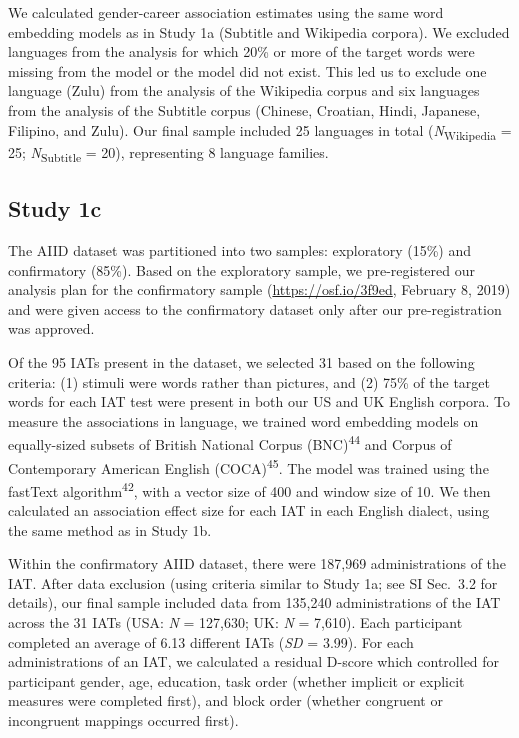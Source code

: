 \documentclass[9pt,twocolumn]{pnas-new}
\begin{document}
We calculated gender-career association estimates using the same word embedding models
as in Study 1a (Subtitle and Wikipedia corpora). We excluded languages
from the analysis for which 20\% or more of the target words were
missing from the model or the model did not exist. This led us to
exclude one language (Zulu) from the analysis of the Wikipedia corpus
and six languages from the analysis of the Subtitle corpus (Chinese,
Croatian, Hindi, Japanese, Filipino, and Zulu). Our final sample
included 25 languages in total (\emph{N}\textsubscript{Wikipedia} = 25;
\emph{N}\textsubscript{Subtitle} = 20), representing 8 language
families. 


\subsection*{Study 1c}

The AIID dataset was partitioned into two samples: exploratory (15\%) and
confirmatory (85\%). Based on the exploratory sample, we pre-registered
our analysis plan for the confirmatory sample
(\url{https://osf.io/3f9ed}, February 8, 2019) and were given access to the confirmatory dataset only after our pre-registration was approved. 

Of the 95 IATs present in the dataset, we selected 31 based on the following criteria: (1) stimuli were words rather than pictures, and (2) 75\% of the target words for each IAT test were present in both our US and UK English corpora. To measure the associations in language, we trained word embedding models on equally-sized subsets of British National Corpus (BNC)\textsuperscript{44} and Corpus of Contemporary American English (COCA)\textsuperscript{45}. The model was trained using the fastText algorithm\textsuperscript{42}, with a vector size of 400 and  window size of 10. We then calculated an association effect size for each IAT in each English dialect, using the same method as in Study 1b. 


Within the confirmatory AIID dataset, there were 187,969 administrations
of the IAT. After data exclusion (using criteria similar to Study 1a; see SI Sec.\ 3.2 for details), our final sample
included data from 135,240 administrations of the IAT across the 31 IATs (USA: \emph{N} = 127,630; UK: \emph{N} = 7,610). Each participant
completed an average of 6.13 different IATs (\emph{SD} = 3.99). For each administrations of an IAT, we calculated a residual D-score which controlled for participant gender, age, education, task order (whether implicit or explicit measures were completed first), and block order (whether congruent or incongruent mappings occurred first).
\end{document}
